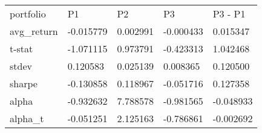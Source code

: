 \begin{tabular}{lllll}
\toprule
\midrule
portfolio & P1 & P2 & P3 & P3 - P1 \\
avg_return & -0.015779 & 0.002991 & -0.000433 & 0.015347 \\
t-stat & -1.071115 & 0.973791 & -0.423313 & 1.042468 \\
stdev & 0.120583 & 0.025139 & 0.008365 & 0.120500 \\
sharpe & -0.130858 & 0.118967 & -0.051716 & 0.127358 \\
alpha & -0.932632 & 7.788578 & -0.981565 & -0.048933 \\
alpha_t & -0.051251 & 2.125163 & -0.786861 & -0.002692 \\
\bottomrule
\end{tabular}

